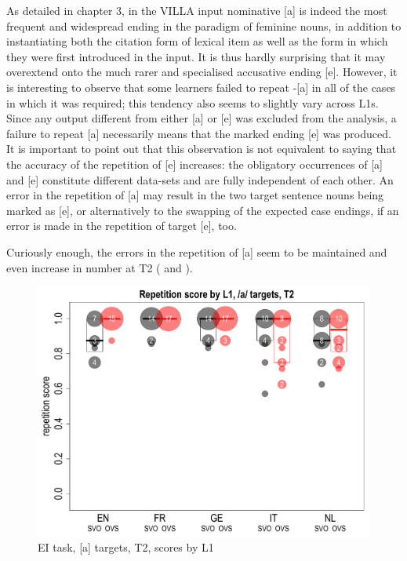 As detailed in chapter 3, in the VILLA input nominative [a] is indeed the most frequent and widespread ending in the paradigm of feminine nouns, in addition to instantiating both the citation form of lexical item as well as the form in which they were first introduced in the input. It is thus hardly surprising that it may overextend onto the much rarer and specialised accusative ending [e]. However, it is interesting to observe that some learners failed to repeat -[a] in all of the cases in which it was required; this tendency also seems to slightly vary across L1s. Since any output different from either [a] or [e] was excluded from the analysis, a failure to repeat [a] necessarily means that the marked ending [e] was produced. It is important to point out that this observation is not equivalent to saying that the accuracy of the repetition of [e] increases: the obligatory occurrences of [a] and [e] constitute different data-sets and are fully independent of each other. An error in the repetition of [a] may result in the two target sentence nouns being marked as [e], or alternatively to the swapping of the expected case endings, if an error is made in the repetition of target [e], too.

Curiously enough, the errors in the repetition of [a] seem to be maintained and even increase in number at T2 ( and ).

\begin{figure}
    \includegraphics[width=\textwidth]{figures/04-7.pdf}
    \caption{EI task, [a] targets, T2, scores by L1}
    \label{fig:04:7}
\end{figure}


